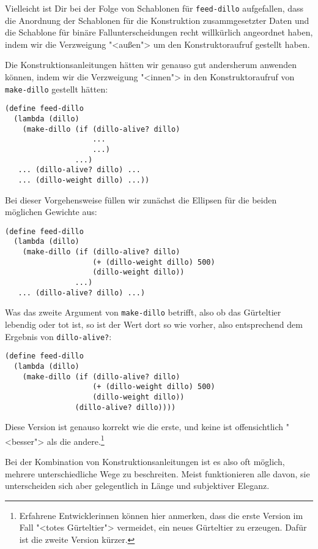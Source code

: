 Vielleicht ist Dir bei der Folge von Schablonen für
\lstinline{feed-dillo} aufgefallen, dass die Anordnung der Schablonen für
die Konstruktion zusammgesetzter Daten und die Schablone für binäre
Fallunterscheidungen recht willkürlich angeordnet haben, indem wir die
Verzweigung "<außen"> um den Konstruktoraufruf gestellt haben.

Die Konstruktionsanleitungen hätten wir genauso gut andersherum
anwenden können, indem wir die Verzweigung "<innen"> in den
Konstruktoraufruf von \lstinline{make-dillo} gestellt hätten:
%
\begin{lstlisting}
(define feed-dillo
  (lambda (dillo)
    (make-dillo (if (dillo-alive? dillo)
                    ...
                    ...)
                ...)
   ... (dillo-alive? dillo) ...
   ... (dillo-weight dillo) ...))
\end{lstlisting}
%
Bei dieser Vorgehensweise füllen wir zunächst die Ellipsen für die
beiden möglichen Gewichte aus:
%
\begin{lstlisting}
(define feed-dillo
  (lambda (dillo)
    (make-dillo (if (dillo-alive? dillo)
                    (+ (dillo-weight dillo) 500)
                    (dillo-weight dillo))
                ...)
   ... (dillo-alive? dillo) ...)
\end{lstlisting}
%
Was das zweite Argument von \lstinline{make-dillo} betrifft, also ob das
Gürteltier lebendig oder tot ist, so ist der Wert dort so wie
vorher, also entsprechend dem Ergebnis von \lstinline{dillo-alive?}:
%
\begin{lstlisting}
(define feed-dillo
  (lambda (dillo)
    (make-dillo (if (dillo-alive? dillo)
                    (+ (dillo-weight dillo) 500)
                    (dillo-weight dillo))
                (dillo-alive? dillo))))
\end{lstlisting}
%
Diese Version ist genauso korrekt wie die erste, und keine ist
offensichtlich "<besser"> als die andere.\footnote{Erfahrene
Entwicklerinnen können hier anmerken, dass die erste Version im Fall
  "<totes Gürteltier"> vermeidet, ein neues Gürteltier zu erzeugen.
  Dafür ist die zweite Version kürzer.}

Bei der Kombination von Konstruktionsanleitungen ist es also oft
möglich, mehrere unterschiedliche Wege zu beschreiten.  Meist
funktionieren alle davon, sie unterscheiden sich aber gelegentlich in
Länge und subjektiver Eleganz.

